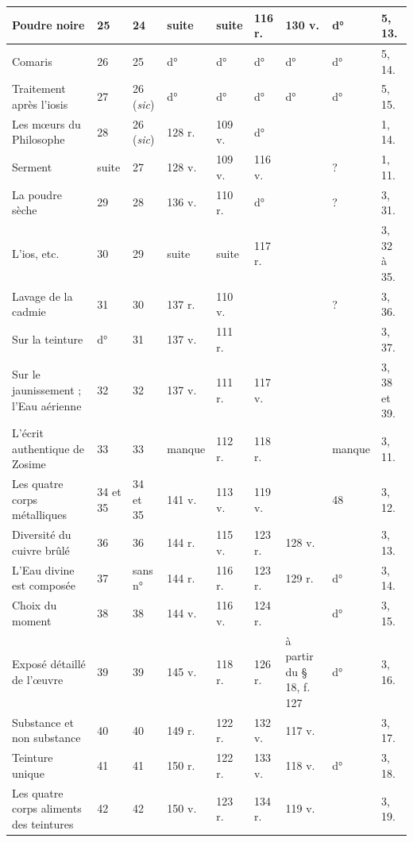 \documentclass[a4paper, 11pt, oneside, polutonikogreek, french]{article}
\begin{document}
\begin{center}
\begin{longtable}{|p{20mm}|p{11mm}|p{11mm}|p{11mm}|p{11mm}|p{11mm}|p{11mm}|p{11mm}|p{15mm}|}
        Poudre noire & 25 & 24 & suite & suite & 116 r. & 130 v. & d° & 5, 13. \\ \hline
        Comaris & 26 & 25 & d° & d° & d° & d° & d° & 5, 14. \\ \hline
        Traitement après l'iosis & 27 & 26 (\emph{sic}) & d° & d° & d° & d° & d° & 5, 15. \\ \hline
        Les mœurs du Philosophe & 28 & 26 (\emph{sic}) & 128 r. & 109 v. & d° & ~ & ~ & 1, 14. \\ \hline
        Serment & suite & 27 & 128 v. & 109 v. & 116 v. & ~ & ? & 1, 11. \\ \hline
        La poudre sèche & 29 & 28 & 136 v. & 110 r. & d° & ~ & ? & 3, 31. \\ \hline
        L'ios, etc. & 30 & 29 & suite & suite & 117 r. & ~ & ~ & 3, 32 à 35. \\ \hline
        Lavage de la cadmie & 31 & 30 & 137 r. & 110 v. & ~ & ~ & ? & 3, 36. \\ \hline
        Sur la teinture & d° & 31 & 137 v. & 111 r. & ~ & ~ & ~ & 3, 37. \\ \hline
        Sur le jaunissement ; l'Eau aérienne & 32 & 32 & 137 v. & 111 r. & 117 v. & ~ & ~ & 3, 38 et 39. \\ \hline
        L'écrit authentique de Zosime & 33 & 33 & manque & 112 r. & 118 r. & ~ & manque & 3, 11. \\ \hline
        Les quatre corps métalliques & 34 et 35 & 34 et 35 & 141 v. & 113 v. & 119 v. & ~ & 48 & 3, 12. \\ \hline
        Diversité du cuivre brûlé & 36 & 36 & 144 r. & 115 v. & 123 r. & 128 v. & ~ & 3, 13. \\ \hline
        L'Eau divine est composée & 37 & sans n° & 144 r. & 116 r. & 123 r. & 129 r. & d° & 3, 14. \\ \hline
        Choix du moment & 38 & 38 & 144 v. & 116 v. & 124 r. & ~ & d° & 3, 15. \\ \hline
        Exposé détaillé de l'œuvre & 39 & 39 & 145 v. & 118 r. & 126 r. & à partir du § 18, f. 127 & d° & 3, 16. \\ \hline
        Substance et non substance & 40 & 40 & 149 r. & 122 r. & 132 v. & 117 v. & ~ & 3, 17. \\ \hline
        Teinture unique & 41 & 41 & 150 r. & 122 r. & 133 v. & 118 v. & d° & 3, 18. \\ \hline
        Les quatre corps aliments des teintures & 42 & 42 & 150 v. & 123 r. & 134 r. & 119 v. & ~ & 3, 19. \\ \hline

\end{longtable}
\end{center}
\end{document}
